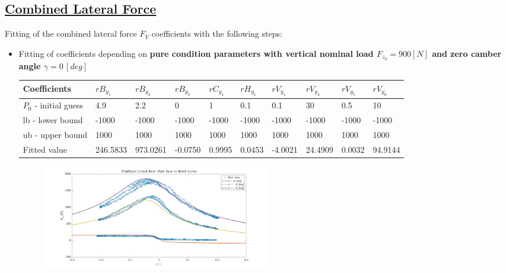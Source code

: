\documentclass{IEEEtran}
\begin{document}
    \subsection{\textbf{\underline{Combined Lateral Force}}}
        Fitting of the combined lateral force $F_{Y}$ coefficients with the following steps:
        \begin{itemize}
            \item Fitting of coefficients depending on \textbf{pure condition parameters with vertical nominal load $ F_{z_0} = 900 [N]$ and zero camber angle $\gamma = 0 \, [deg]$} \\
            
            \begin{table}[htbp]
                \begin{adjustbox}{width=\columnwidth,center}
                    \begin{tabular}{|l|l|l|l|l|l|l|l|l|l|}
                    \hline
                    Coefficients       & $rB_{y_1}$ & $rB_{y_2}$ & $rB_{y_3}$ & $rC_{y_1}$ & $rH_{y_1}$ & $rV_{y_1}$ & $rV_{y_4}$ & $rV_{y_5}$ & $rV_{y_6}$ \\
                    \hline
                    $P_0$ - initial guess & 4.9 & 2.2 & 0 & 1 & 0.1 & 0.1 & 30 & 0.5 & 10 \\ \hline
                    lb - lower bound   & -1000 & -1000 & -1000 & -1000 & -1000 & -1000 & -1000 & -1000 & -1000 \\ \hline
                    ub - upper bound   & 1000 & 1000 & 1000 & 1000 & 1000 & 1000 & 1000 & 1000 & 1000 \\ \hline
                    Fitted value  & 246.5833 & 973.0261 & -0.0750 & 0.9995 & 0.0453 & -4.0021 & 24.4909 & 0.0032 & 94.9144 \\ \hline
                    \end{tabular}
                \end{adjustbox}
            \end{table}          
                    
            \begin{figure}[htbp]
                \centerline{\includegraphics[width = 3.95in]{combined_lateral_1.jpg}}
                

\end{figure}
\end{itemize}
\end{document}
